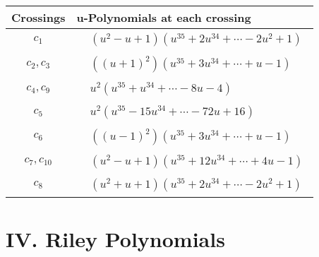 \documentclass[1p]{elsarticle_modified}
\theoremstyle{definition}
\begin{document}
\begin{tabular}{m{50pt}|m{274pt}}
Crossings & \hspace{64pt}u-Polynomials at each crossing \\
\hline $$\begin{aligned}c_{1}\end{aligned}$$&$\begin{aligned}
&(u^2- u+1)(u^{35}+2 u^{34}+\cdots-2 u^2+1)
\end{aligned}$\\
\hline $$\begin{aligned}c_{2},c_{3}\end{aligned}$$&$\begin{aligned}
&((u+1)^2)(u^{35}+3 u^{34}+\cdots+u-1)
\end{aligned}$\\
\hline $$\begin{aligned}c_{4},c_{9}\end{aligned}$$&$\begin{aligned}
&u^2(u^{35}+u^{34}+\cdots-8 u-4)
\end{aligned}$\\
\hline $$\begin{aligned}c_{5}\end{aligned}$$&$\begin{aligned}
&u^2(u^{35}-15 u^{34}+\cdots-72 u+16)
\end{aligned}$\\
\hline $$\begin{aligned}c_{6}\end{aligned}$$&$\begin{aligned}
&((u-1)^2)(u^{35}+3 u^{34}+\cdots+u-1)
\end{aligned}$\\
\hline $$\begin{aligned}c_{7},c_{10}\end{aligned}$$&$\begin{aligned}
&(u^2- u+1)(u^{35}+12 u^{34}+\cdots+4 u-1)
\end{aligned}$\\
\hline $$\begin{aligned}c_{8}\end{aligned}$$&$\begin{aligned}
&(u^2+u+1)(u^{35}+2 u^{34}+\cdots-2 u^2+1)
\end{aligned}$\\
\hline
\end{tabular}\newpage\renewcommand{\arraystretch}{1}
\centering \section*{ IV. Riley Polynomials}
\end{document}
